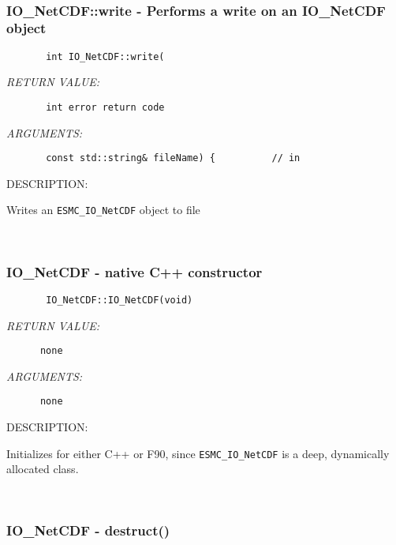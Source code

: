  
\mbox{}\hrulefill\ 
 
\subsubsection [IO\_NetCDF::write] {IO\_NetCDF::write - Performs a write on an IO\_NetCDF object}


  
\begin{verbatim}       int IO_NetCDF::write(\end{verbatim}{\em RETURN VALUE:}
\begin{verbatim}       int error return code\end{verbatim}{\em ARGUMENTS:}
\begin{verbatim}       const std::string& fileName) {          // in
 \end{verbatim}
{\sf DESCRIPTION:\\ }


        Writes an {\tt ESMC\_IO_NetCDF} object to file
   
 
\mbox{}\hrulefill\ 
 
\subsubsection [IO\_NetCDF] {IO\_NetCDF - native C++ constructor}


  
\begin{verbatim}       IO_NetCDF::IO_NetCDF(void)\end{verbatim}{\em RETURN VALUE:}
\begin{verbatim}      none\end{verbatim}{\em ARGUMENTS:}
\begin{verbatim}      none\end{verbatim}
{\sf DESCRIPTION:\\ }


        Initializes for either C++ or F90, since {\tt ESMC\_IO\_NetCDF} is a deep,
        dynamically allocated class.
   
 
\mbox{}\hrulefill\ 
 
\subsubsection [IO\_NetCDF] {IO\_NetCDF - destruct()}


